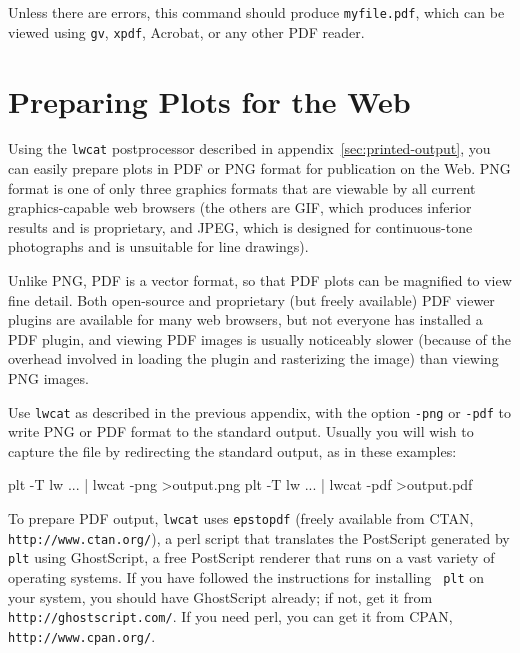 \documentclass{book}
\begin{document}
Unless there are errors, this command should produce {\tt myfile.pdf}, which
can be viewed using {\tt gv}, {\tt xpdf}, Acrobat, or any other PDF reader.

\chapter{Preparing Plots for the Web \label{sec:web-output}}

%
%
%
Using the {\tt lwcat} postprocessor described in
appendix~\ref{sec:printed-output}, you can easily prepare plots in PDF
or PNG format for publication on the Web.  PNG format is one of only
three graphics formats that are viewable by all current
graphics-capable web browsers (the others are GIF, which produces
inferior results and is proprietary, and JPEG, which is designed for
continuous-tone photographs and is unsuitable for line drawings).

Unlike PNG, PDF is a vector format, so that PDF plots can be magnified
to view fine detail.  Both open-source and proprietary (but freely available)
PDF viewer plugins are available for many web browsers, but not everyone
has installed a PDF plugin, and viewing PDF images is usually noticeably
slower (because of the overhead involved in loading the plugin and
rasterizing the image) than viewing PNG images.

Use {\tt lwcat} as described in the previous appendix, with the option
{\tt -png} or {\tt -pdf} to write PNG or PDF format to the standard output.
Usually you will wish to capture the file by redirecting the standard output,
as in these examples:
\begin{center}
\begin{boxedverbatim}
plt -T lw ... | lwcat -png >output.png
plt -T lw ... | lwcat -pdf >output.pdf
\end{boxedverbatim}
\end{center}

To prepare PDF output, {\tt lwcat} uses {\tt epstopdf} (freely
available from CTAN, {\tt http://www.ctan.org/}), a perl script that
translates the PostScript generated by {\tt plt} using GhostScript, a
free PostScript renderer that runs on a vast variety of operating
systems.  If you have followed the instructions for installing {\tt
plt} on your system, you should have GhostScript already; if not, get
it from {\tt http://ghostscript\-.com/}.  If you need perl, you can
get it from CPAN, {\tt http://www.cpan.org/}.
\end{document}
